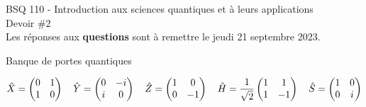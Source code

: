 \documentclass[11pt]{article}
\begin{document}
\begin{center}
    {\Large BSQ 110 - Introduction aux sciences quantiques et à leurs applications} \\ \vspace{5mm}
    {\LARGE\sffamily Devoir \#2} \\
    Les réponses aux \textbf{questions} sont à remettre le jeudi 21 septembre 2023.
\end{center}

\def\exerpath{questions}

\begin{linedsection}{Banque de portes quantiques}
    
    \begin{align*}
        \hat{X} = \begin{pmatrix}0 & 1 \\ 1 & 0\end{pmatrix} \quad \hat{Y} = \begin{pmatrix}0 & -i \\ i & 0\end{pmatrix} \quad \hat{Z} = \begin{pmatrix}1 & 0 \\ 0 & -1\end{pmatrix} \quad \hat{H} = \frac{1}{\sqrt{2}}\begin{pmatrix}1 & 1 \\ 1 & -1\end{pmatrix} \quad \hat{S} = \begin{pmatrix}1 & 0 \\ 0 & i\end{pmatrix}
    \end{align*}
\end{linedsection}




\end{document}
